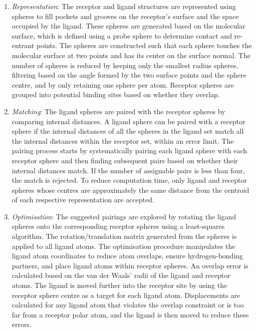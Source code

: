 \documentclass[11pt]{article}
\begin{document}
\begin{enumerate}
    \item \textit{Representation}: The receptor and ligand structures are represented using spheres to fill pockets and grooves on the receptor's surface and the space occupied by the ligand. These spheres are generated based on the molecular surface, which is defined using a probe sphere to determine contact and re-entrant points. The spheres are constructed such that each sphere touches the molecular surface at two points and has its center on the surface normal. The number of spheres is reduced by keeping only the smallest radius spheres, filtering based on the angle formed by the two surface points and the sphere centre, and by only retaining one sphere per atom. Receptor spheres are grouped into potential binding sites based on whether they overlap.
   
    \item \textit{Matching}: The ligand spheres are paired with the receptor spheres by comparing internal distances. A ligand sphere can be paired with a receptor sphere if the internal distances of all the spheres in the ligand set match all the internal distances within the receptor set, within an error limit. The pairing process starts by systematically pairing each ligand sphere with each receptor sphere and then finding subsequent pairs based on whether their internal distances match. If the number of assignable pairs is less than four, the match is rejected. To reduce computation time, only ligand and receptor spheres whose centres are approximately the same distance from the centroid of each respective representation are accepted.

   \item \textit{Optimisation}: The suggested pairings are explored by rotating the ligand spheres onto the corresponding receptor spheres using a least-squares algorithm. The rotation/translation matrix generated from the spheres is applied to all ligand atoms. The optimisation procedure manipulates the ligand atom coordinates to reduce atom overlaps, ensure hydrogen-bonding partners, and place ligand atoms within receptor spheres. An overlap error is calculated based on the van der Waals' radii of the ligand and receptor atoms. The ligand is moved further into the receptor site by using the receptor sphere centre as a target for each ligand atom. Displacements are calculated for any ligand atom that violates the overlap constraint or is too far from a receptor polar atom, and the ligand is then moved to reduce these errors.
   
\end{enumerate}
\end{document}
